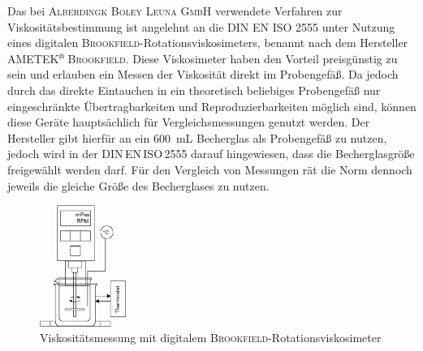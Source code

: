 Das bei \textsc{Alberdingk Boley Leuna GmbH} verwendete Verfahren zur Viskositätsbestimmung ist angelehnt an die DIN EN ISO 2555 unter Nutzung eines digitalen \textsc{Brookfield}-Rotationsviskosimeters, benannt nach dem Hersteller \textsc{AMETEK$^\text{\textregistered}$\,Brookfield}. Diese Viskosimeter haben den Vorteil preisgünstig zu sein und erlauben ein Messen der Viskosität direkt im Probengefäß. Da jedoch durch das direkte Eintauchen in ein theoretisch beliebiges Probengefäß nur eingeschränkte Übertragbarkeiten und Reproduzierbarkeiten möglich sind, können diese Geräte hauptsächlich für Vergleichsmessungen genutzt werden.  Der Hersteller gibt hierfür an ein \SI{600}{\milli \liter} Becherglas als Probengefäß zu nutzen, jedoch wird in der DIN\,EN\,ISO\,2555 darauf hingewiesen, dass die Becherglasgröße freigewählt werden darf. Für den Vergleich von Messungen rät die Norm dennoch jeweils die gleiche Größe des Becherglases zu nutzen. \cite{ROMPPRedaktion.2008, brookfield_31.01.2022, DINDeutschesInstitutfurNormunge.V..September2018}

\begin{figure}
	\centering
	\includegraphics[width=0.25\textwidth]{img/viskosimeter}
	\caption{Viskositätsmessung mit digitalem \textsc{Brookfield}-\linebreak Rotationsviskosimeter}
	\label{fig: viskosimeter}
\end{figure}
\FloatBarrier

